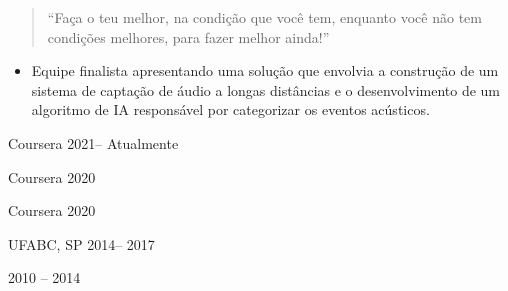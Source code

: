 
\begin{quote}
	``Faça o teu melhor, na condição que você tem, enquanto você não tem condições melhores, 
	para fazer melhor ainda!''
\end{quote}

\begin{itemize}
						
	\justifying
	\item Equipe finalista apresentando uma solução que envolvia a construção
	      de um sistema de captação de áudio a longas distâncias e o desenvolvimento de um 
	      algoritmo de IA responsável por categorizar os eventos acústicos.
	      	      	      	      	      	        
\end{itemize}



 {Coursera} {2021-- Atualmente}{} 

 {Coursera} {2020}{} 

 {Coursera} {2020}{} 

 {UFABC, SP} {2014-- 2017}{} 

 {2010 -- 2014}{}


\clearpage
